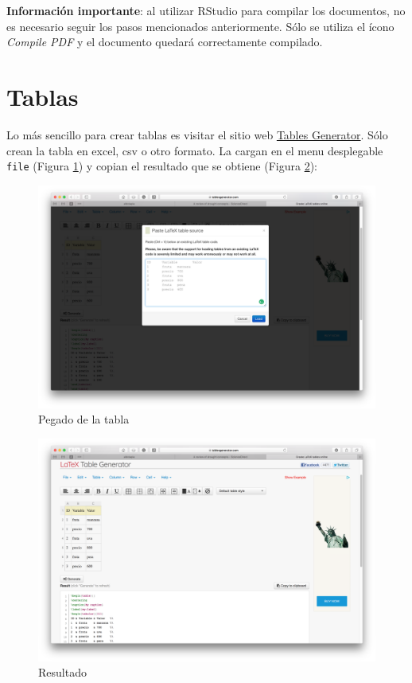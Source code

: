 \documentclass[10pt,]{article}
\begin{document}
\textbf{Información importante}: al utilizar RStudio para compilar los documentos, no es necesario seguir los pasos mencionados anteriormente. Sólo se utiliza el ícono \textit{Compile PDF} y el documento quedará correctamente compilado.

\section{Tablas\\}

Lo más sencillo para crear tablas es visitar el sitio web \href{https://www.tablesgenerator.com/latex_tables}{Tables Generator}. Sólo crean la tabla en excel, csv o otro formato. La cargan en el menu desplegable \verb!file! (Figura \ref{tabla1}) y copian el resultado que se obtiene (Figura \ref{tabla2}):

\begin{figure}[!h]
\begin{center}
\includegraphics[width=\textwidth]{Figuras/tabla1.png}
\caption{Pegado de la tabla}
\label{tabla1}
\end{center}
\end{figure}

\begin{figure}[!h]
\begin{center}
\includegraphics[width=\textwidth]{Figuras/tabla2.png}
\caption{Resultado}
\label{tabla2}
\end{center}
\end{figure}
\end{document}
